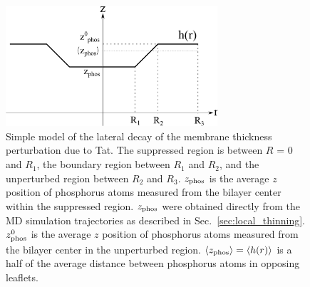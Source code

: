 \begin{figure}[htbp]
  \centering
  \includegraphics[width=0.7\textwidth]{./figures/Tat/MMs/linear_model}
  \caption{Simple model of the lateral decay of the membrane thickness 
  perturbation due to Tat. The suppressed region is between $R$ = 0 and $R_1$,
  the boundary region between $R_1$ and $R_2$, and the unperturbed
  region between $R_2$ and $R_3$. $z_\textrm{phos}$ is the average $z$ position of
  phosphorus atoms measured from the bilayer center within the suppressed region.
  $z_\textrm{phos}$ were obtained directly from the MD simulation trajectories as described in 
  Sec.~\ref{sec:local_thinning}. $z_\textrm{phos}^0$ is the average $z$ position of 
  phosphorus atoms measured from the bilayer center in the unperturbed region.
  $\langle z_\textrm{phos}\rangle = \langle h(r)\rangle$ is a half of the average distance 
  between phosphorus atoms in opposing leaflets.}
  \label{fig:linear_model}
\end{figure}

